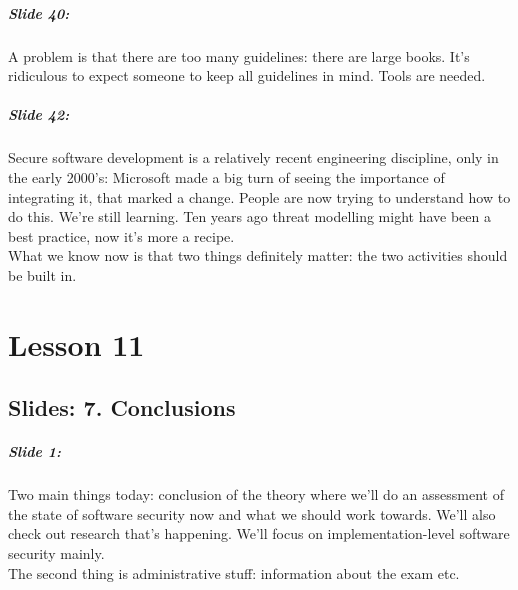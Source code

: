 \documentclass[10pt,a4paper]{report}
\begin{document}
\paragraph{Slide 40:} A problem is that there are too many guidelines: there are large books. It's ridiculous to expect someone to keep all guidelines in mind. Tools are needed. 

\paragraph{Slide 42:} Secure software development is a relatively recent engineering discipline, only in the early 2000's: Microsoft made a big turn of seeing the importance of integrating it, that marked a change. People are now trying to understand how to do this. We're still learning. Ten years ago threat modelling might have been a best practice, now it's more a recipe. \\
What we know now is that two things definitely matter: the two activities should be built in. 

\chapter{Lesson 11}
\section{Slides: 7. Conclusions}

\paragraph{Slide 1:} Two main things today: conclusion of the theory where we'll do an assessment of the state of software security now and what we should work towards. We'll also check out research that's happening. We'll focus on implementation-level software security mainly. \\
The second thing is administrative stuff: information about the exam etc.
\end{document}
